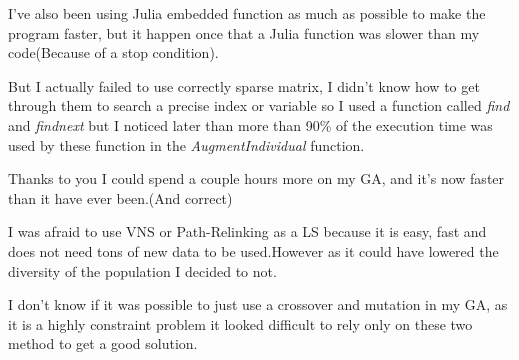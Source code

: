 \documentclass[12pt]{article}
\begin{document}
	I've also been using Julia embedded function as much as possible to make the program faster, but it happen once that a Julia function was slower than my code(Because of a stop condition).
	
	But I actually failed to use correctly sparse matrix, I didn't know how to get through them to search a precise index or variable so I used a function called \textit{find} and \textit{findnext} but I noticed later than more than 90\% of the execution time was used by these function in the \textit{AugmentIndividual} function. 
	
	Thanks to you I could spend a couple hours more on my GA, and it's now faster than it have ever been.(And correct)
	
	I was afraid to use VNS or Path-Relinking as a LS because it is easy, fast and does not need tons of new data to be used.However as it could have lowered the diversity of the population I decided to not.
	
	I don't know if it was possible to just use a crossover and mutation in my GA, as it is a highly constraint problem it looked difficult to rely only on these two method to get a good solution.
	
\end{document}

